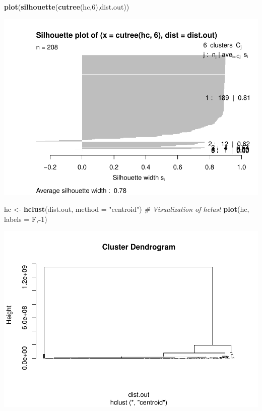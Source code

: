 \documentclass[
]{article}
\newenvironment{Shaded}{\begin{snugshade}}{\end{snugshade}}
\newcommand{\CommentTok}[1]{\textcolor[rgb]{0.56,0.35,0.01}{\textit{#1}}}
\newcommand{\DataTypeTok}[1]{\textcolor[rgb]{0.13,0.29,0.53}{#1}}
\newcommand{\DecValTok}[1]{\textcolor[rgb]{0.00,0.00,0.81}{#1}}
\newcommand{\KeywordTok}[1]{\textcolor[rgb]{0.13,0.29,0.53}{\textbf{#1}}}
\newcommand{\NormalTok}[1]{#1}
\newcommand{\OperatorTok}[1]{\textcolor[rgb]{0.81,0.36,0.00}{\textbf{#1}}}
\newcommand{\StringTok}[1]{\textcolor[rgb]{0.31,0.60,0.02}{#1}}
\begin{document}
\begin{Shaded}
\begin{Highlighting}[]
\KeywordTok{plot}\NormalTok{(}\KeywordTok{silhouette}\NormalTok{(}\KeywordTok{cutree}\NormalTok{(hc,}\DecValTok{6}\NormalTok{),dist.out))}
\end{Highlighting}
\end{Shaded}

\includegraphics{Assignment1_files/figure-latex/unnamed-chunk-26-10.pdf}

\begin{Shaded}
\begin{Highlighting}[]
\NormalTok{hc <-}\StringTok{ }\KeywordTok{hclust}\NormalTok{(dist.out,}
             \DataTypeTok{method =} \StringTok{"centroid"}\NormalTok{)}
\CommentTok{# Visualization of hclust}
\KeywordTok{plot}\NormalTok{(hc, }\DataTypeTok{labels =}\NormalTok{ F,}\OperatorTok{-}\DecValTok{1}\NormalTok{)}
\end{Highlighting}
\end{Shaded}

\includegraphics{Assignment1_files/figure-latex/unnamed-chunk-26-11.pdf}
\end{document}
